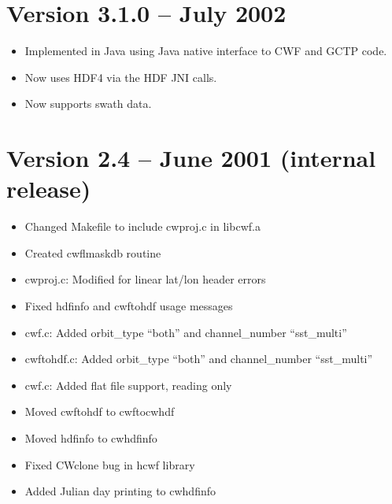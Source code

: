 
\section{Version 3.1.0 -- July 2002}

\begin{itemize}

  \item Implemented in Java using Java native interface to CWF and
  GCTP code.

  \item Now uses HDF4 via the HDF JNI calls.

  \item Now supports swath data.

\end{itemize}


\section{Version 2.4 -- June 2001 (internal release)}

\begin{itemize}

  \item Changed Makefile to include cwproj.c in libcwf.a

  \item Created cwflmaskdb routine

  \item cwproj.c: Modified for linear lat/lon header errors

  \item Fixed hdfinfo and cwftohdf usage messages

  \item cwf.c: Added orbit\_type ``both'' and channel\_number
  ``sst\_multi''

  \item cwftohdf.c: Added orbit\_type ``both'' and channel\_number
  ``sst\_multi''

  \item cwf.c: Added flat file support, reading only

  \item Moved cwftohdf to cwftocwhdf

  \item Moved hdfinfo to cwhdfinfo

  \item Fixed CWclone bug in hcwf library

  \item Added Julian day printing to cwhdfinfo

\end{itemize}

